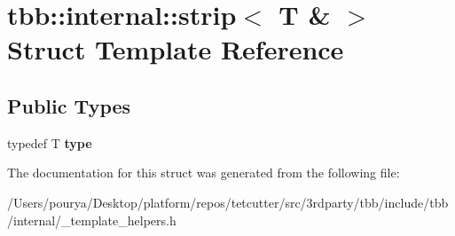 \hypertarget{structtbb_1_1internal_1_1strip_3_01T_01_6_01_4}{}\section{tbb\+:\+:internal\+:\+:strip$<$ T \& $>$ Struct Template Reference}
\label{structtbb_1_1internal_1_1strip_3_01T_01_6_01_4}
\subsection*{Public Types}
\begin{DoxyCompactItemize}
\item 
\hypertarget{structtbb_1_1internal_1_1strip_3_01T_01_6_01_4_aa59b0cfef948dfcf586e569c76a3656f}{}typedef T {\bfseries type}\label{structtbb_1_1internal_1_1strip_3_01T_01_6_01_4_aa59b0cfef948dfcf586e569c76a3656f}

\end{DoxyCompactItemize}


The documentation for this struct was generated from the following file\+:\begin{DoxyCompactItemize}
\item 
/\+Users/pourya/\+Desktop/platform/repos/tetcutter/src/3rdparty/tbb/include/tbb/internal/\+\_\+template\+\_\+helpers.\+h\end{DoxyCompactItemize}
